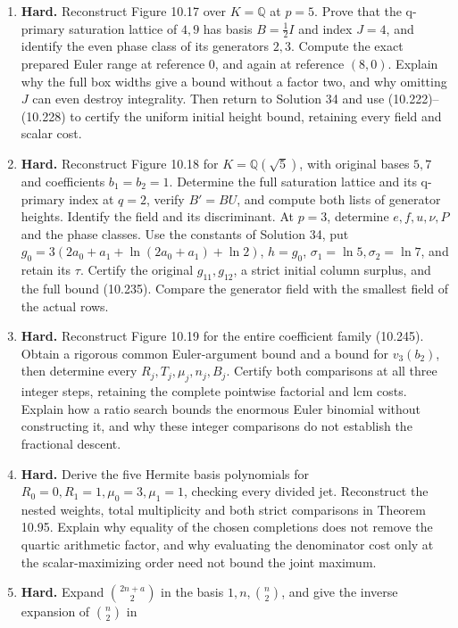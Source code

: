 \documentclass[
  11pt,
  a4paper,
]{article}
\begin{document}
\begin{enumerate}
  for \(\alpha=-\beta,\zeta=-1\).
\item
  \textbf{Hard.} Reconstruct Figure 10.17 over \(K=\mathbb Q\) at
  \(p=5\). Prove that the q-primary saturation lattice of \(4,9\) has
  basis \(B=\tfrac12I\) and index \(J=4\), and identify the even phase
  class of its generators \(2,3\). Compute the exact prepared Euler
  range at reference \(0\), and again at reference \((8,0)\). Explain
  why the full box widths give a bound without a factor two, and why
  omitting \(J\) can even destroy integrality. Then return to Solution
  34 and use (10.222)--(10.228) to certify the uniform initial height
  bound, retaining every field and scalar cost.
\item
  \textbf{Hard.} Reconstruct Figure 10.18 for \(K=\mathbb Q(\sqrt5)\),
  with original bases \(5,7\) and coefficients \(b_1=b_2=1\). Determine
  the full saturation lattice and its q-primary index at \(q=2\), verify
  \(B'=BU\), and compute both lists of generator heights. Identify the
  field and its discriminant. At \(p=3\), determine \(e,f,u,\nu,P\) and
  the phase classes. Use the constants of Solution 34, put
  \(g_0=3(2a_0+a_1+\ln(2a_0+a_1)+\ln2)\), \(h=g_0\),
  \(\sigma_1=\ln5,\sigma_2=\ln7\), and retain its \(\tau\). Certify the
  original \(g_{11},g_{12}\), a strict initial column surplus, and the
  full bound (10.235). Compare the generator field with the smallest
  field of the actual rows.
\item
  \textbf{Hard.} Reconstruct Figure 10.19 for the entire coefficient
  family (10.245). Obtain a rigorous common Euler-argument bound and a
  bound for \(v_3(b_2)\), then determine every
  \(R_j,T_j,\mu_j,n_j,B_j\). Certify both comparisons at all three
  integer steps, retaining the complete pointwise factorial and lcm
  costs. Explain how a ratio search bounds the enormous Euler binomial
  without constructing it, and why these integer comparisons do not
  establish the fractional descent.
\item
  \textbf{Hard.} Derive the five Hermite basis polynomials for
  \(R_0=0,R_1=1,\mu_0=3,\mu_1=1\), checking every divided jet.
  Reconstruct the nested weights, total multiplicity and both strict
  comparisons in Theorem 10.95. Explain why equality of the chosen
  completions does not remove the quartic arithmetic factor, and why
  evaluating the denominator cost only at the scalar-maximizing order
  need not bound the joint maximum.
\item
  \textbf{Hard.} Expand \(\binom{2n+a}{2}\) in the basis
  \(1,n,\binom n2\), and give the inverse expansion of \(\binom n2\) in

\end{enumerate}
\end{document}
